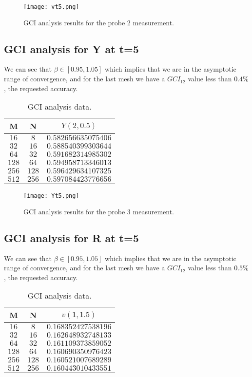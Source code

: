 \begin{figure}[H]
\centering     %
\texttt{[image: vt5.png]}
\caption{GCI analysis results for the probe 2 measurement.}
\end{figure}

\subsection*{GCI analysis for Y at t=5}

We can see that $\beta\in[0.95,1.05]$ which implies that we are in the asymptotic range of convergence, and for the last mesh we have a $GCI_{12}$ value less than $0.4\%$, the requested accuracy.

\begin{table}[H]
\centering
\begin{tabular}{|c|c|c|}
M & N & $Y(2,0.5)$ \\
\hline
$16$ & $8$ & $   0.582656635075406$ \\
$32$ & $16$ & $   0.588540399303644$ \\
$64$ & $32$ & $   0.591682314985302$ \\
$128$ & $64$ & $   0.594958713346013$ \\
$256$ & $128$ & $   0.596429634107325$ \\
$512$ & $256$ & $   0.597084423776656$ \\
\end{tabular}
\caption{GCI analysis data.}
\end{table}

\begin{figure}[H]
\centering     %
\texttt{[image: Yt5.png]}
\caption{GCI analysis results for the probe 3 measurement.}
\end{figure}

\subsection*{GCI analysis for R at t=5}

We can see that $\beta\in[0.95,1.05]$ which implies that we are in the asymptotic range of convergence, and for the last mesh we have a $GCI_{12}$ value less than $0.5\%$, the requested accuracy.

\begin{table}[H]
\centering
\begin{tabular}{|c|c|c|}
M & N & $v(1,1.5)$ \\
\hline
$16$ & $8$ & $   0.168352427538196$ \\
$32$ & $16$ & $   0.162648932748133$ \\
$64$ & $32$ & $   0.161109373859052$ \\
$128$ & $64$ & $   0.160690350976423$ \\
$256$ & $128$ & $   0.160521007689289$ \\
$512$ & $256$ & $   0.160443010433551$ \\
\end{tabular}
\caption{GCI analysis data.}
\end{table}

